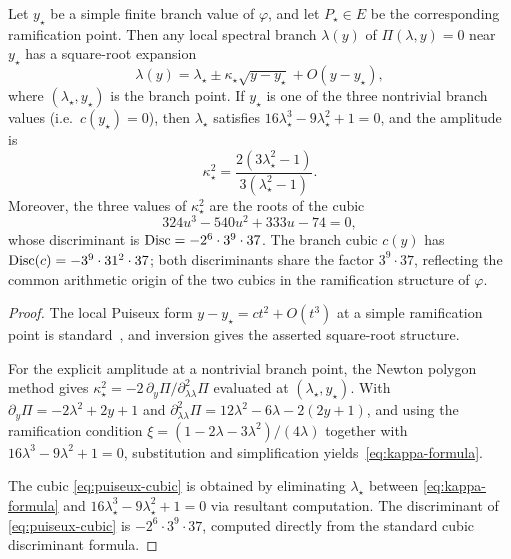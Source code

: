 \begin{theorem}\label{thm:puiseux-amplitude}
Let $y_\star$ be a simple finite branch value of $\varphi$, and let $P_\star\in E$ be the corresponding ramification point.
Then any local spectral branch $\lambda(y)$ of $\Pi(\lambda,y)=0$ near $y_\star$ has a square-root expansion
\[
\lambda(y)=\lambda_\star \pm \kappa_\star \sqrt{y-y_\star}+O(y-y_\star),
\]
where $(\lambda_\star,y_\star)$ is the branch point.
If $y_\star$ is one of the three nontrivial branch values (i.e.\ $c(y_\star)=0$), then $\lambda_\star$ satisfies
$16\lambda_\star^3-9\lambda_\star^2+1=0$, and the amplitude is
\begin{equation}\label{eq:kappa-formula}
\kappa_\star^{2}=\frac{2(3\lambda_\star^{2}-1)}{3(\lambda_\star^{2}-1)}.
\end{equation}
Moreover, the three values of $\kappa_\star^2$ are the roots of the cubic
\begin{equation}\label{eq:puiseux-cubic}
324u^3-540u^2+333u-74=0,
\end{equation}
whose discriminant is $\operatorname{Disc}=-2^{6}\cdot 3^{9}\cdot 37$.
The branch cubic $c(y)$ has $\operatorname{Disc}(c)=-3^9\cdot 31^2\cdot 37$; both discriminants share the factor $3^9\cdot 37$, reflecting the common arithmetic origin of the two cubics in the ramification structure of $\varphi$.
\end{theorem}

\begin{proof}
The local Puiseux form $y-y_\star=ct^2+O(t^3)$ at a simple ramification point is standard~\cite{Silverman2009},
and inversion gives the asserted square-root structure.

For the explicit amplitude at a nontrivial branch point, the Newton polygon method gives
$\kappa_\star^2=-2\,\partial_y\Pi/\partial^2_{\lambda\lambda}\Pi$ evaluated at $(\lambda_\star,y_\star)$.
With $\partial_y\Pi=-2\lambda^2+2y+1$ and $\partial^2_{\lambda\lambda}\Pi=12\lambda^2-6\lambda-2(2y+1)$,
and using the ramification condition $\xi=(1-2\lambda-3\lambda^2)/(4\lambda)$ together with $16\lambda^3-9\lambda^2+1=0$,
substitution and simplification yields~\eqref{eq:kappa-formula}.

The cubic \eqref{eq:puiseux-cubic} is obtained by eliminating $\lambda_\star$ between \eqref{eq:kappa-formula} and $16\lambda_\star^3-9\lambda_\star^2+1=0$ via resultant computation.
The discriminant of \eqref{eq:puiseux-cubic} is $-2^{6}\cdot 3^{9}\cdot 37$, computed directly from the standard cubic discriminant formula.
\end{proof}

